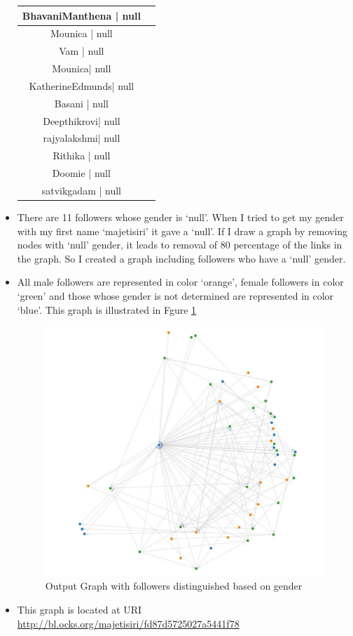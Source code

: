 \begin{itemize}
\begin{table}
\begin{center}
\begin{tabular}{| c | c |}
BhavaniManthena	|	null\\ \hline		
Mounica		|		null\\ \hline		
Vam				|	null\\ \hline		
Mounica|			null\\ \hline		
KatherineEdmunds|	null\\ \hline
Basani			|	null\\ \hline	
Deepthikrovi| 		null\\ \hline
rajyalakshmi| 		null\\ \hline
Rithika		|		null\\ \hline	
Doomie		|		null\\ \hline
satvikgadam   |  	null\\ \hline	
                
\end{tabular}
\end{center}
\end{table}
\item There are 11 followers whose gender is `null'. When I tried to get my gender with my first name `majetisiri' it gave a `null'. If I draw a graph by removing nodes with `null' gender, it leads to removal of 80 percentage of the links in the graph. So I created a graph including followers who have a `null' gender.
\item All male followers are represented in color `orange', female followers in color `green' and those whose gender is not determined are represented in color `blue'. This graph is illustrated in Fgure \ref{fig:q1fig2}
\begin{figure}[h!]
\begin{center}
\includegraphics[scale=0.55, keepaspectratio=true]{figures/5.JPG}
\caption{Output Graph with followers distinguished based on gender}
\label{fig:q1fig2}
\end{center}
\end{figure}
\item This graph is located at URI \url{http://bl.ocks.org/majetisiri/fd87d5725027a5441f78}
\end{itemize}

